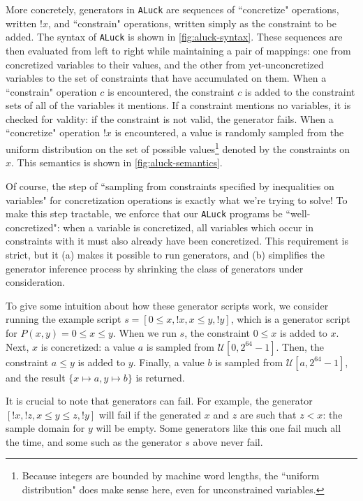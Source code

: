\documentclass[10pt,a4paper]{article}
\begin{document}
More concretely, generators in \texttt{ALuck} are sequences of ``concretize" operations, written $!x$, and ``constrain" operations, written simply as the constraint to be added. The syntax of \texttt{ALuck} is shown in \autoref{fig:aluck-syntax}. These sequences are then evaluated from left to right while maintaining a pair of mappings: one from concretized variables to their values, and the other from yet-unconcretized variables to the set of constraints that have accumulated on them.
When a ``constrain" operation $c$ is encountered, the constraint $c$ is added to the constraint sets of all of the variables it mentions. If a constraint mentions no variables, it is checked for valdity: if the constraint is not valid, the generator fails. When a ``concretize" operation $!x$ is encountered, a value is randomly sampled from the uniform distribution on the set of possible values\footnote{
Because integers are bounded by machine word lengths, the ``uniform distribution" does make sense here, even for unconstrained variables.
} denoted by the constraints on $x$. This semantics is shown in \autoref{fig:aluck-semantics}.

Of course, the step of ``sampling from constraints specified by inequalities on variables" for concretization operations is exactly what we're trying to solve! To make this step tractable, we enforce that our \texttt{ALuck} programs be ``well-concretized": when a variable is concretized, all variables which occur in constraints with it must also already have been concretized. This requirement is strict, but it (a) makes it possible to run generators, and (b) simplifies the generator inference process by shrinking the class of generators under consideration.

To give some intuition about how these generator scripts work, we consider running the example script $s = [0 \leq x, !x, x \leq y, !y]$, which is a generator 
script for $P(x,y) = 0\leq x \leq y$. When we run $s$, the constraint $0 \leq x$ is added to $x$. Next, $x$ is concretized: a value $a$ is sampled from 
$\mathcal{U}\left[0,2^{64}-1\right]$. Then, the constraint $a \leq y$ is added to $y$. Finally, a value $b$ is sampled from $\mathcal{U}\left[a,2^{64}-1\right]$, and the result $\{x \mapsto a, y \mapsto b\}$ is returned.

It is crucial to note that generators can fail. For example, the generator $[!x,!z, x \leq y \leq z, !y]$ will fail if the generated $x$ and $z$ are such that $z < x$:  the sample domain for $y$ will be empty. Some generators like this one fail much all the time, and some such as the generator $s$ above never fail.
\end{document}

